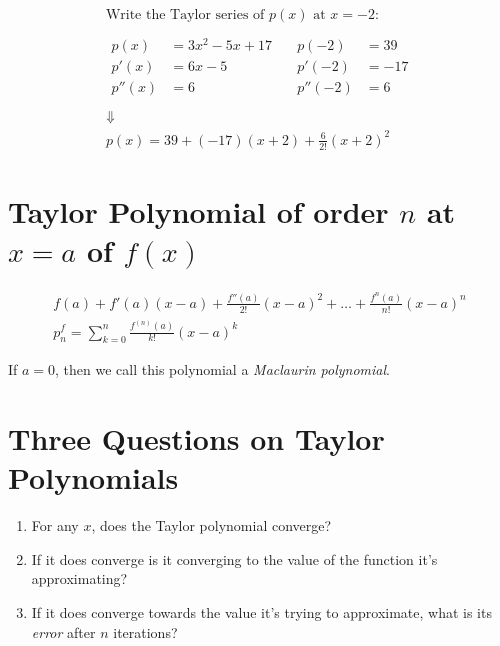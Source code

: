 \documentclass[00_complete]{subfiles}
\begin{document}
\begin{example}
$$
\begin{gathered}
    \text{Write the Taylor series of $p(x)$ at $x=-2$:} \\
    \\
    \begin{aligned}
        p(x) &= 3x^2-5x+17 \\
        p'(x) &= 6x-5 \\
        p''(x) &= 6 \\
    \end{aligned} \quad
    \begin{aligned}
        p(-2) &= 39 \\
        p'(-2) &= -17 \\
        p''(-2) &= 6 \\
    \end{aligned} \\
    \Downarrow \\
    p(x) = 39 + (-17)(x+2)+ \frac{6}{2!}(x+2)^2
\end{gathered}
$$
\end{example}

\section{Taylor Polynomial of order \texorpdfstring{$n$}{n} at
\texorpdfstring{$x=a$}{x=a} of \texorpdfstring{$f(x)$}{f(x)}}

$$
\begin{gathered}
    f(a)+ f'(a)(x-a)+ \frac{f''(a)}{2!}(x-a)^2+ \dots +
    \frac{f^{n}(a)}{n!}(x-a)^n \\
    \boxed{p^f_n = \sum_{k=0}^{n} \frac{f^{(n)}(a)}{k!}(x-a)^k}
\end{gathered}
$$
\begin{note}
    If $a=0$, then we call this polynomial a \emph{Maclaurin polynomial}.
\end{note}

\section{Three Questions on Taylor Polynomials}

\begin{enumerate}
  \item For any $x$, does the Taylor polynomial converge?
  \item If it does converge is it converging to the value of the function it's
      approximating?
  \item If it does converge towards the value it's trying to approximate, what
      is its \emph{error} after $n$ iterations?
\end{enumerate}
\end{document}
